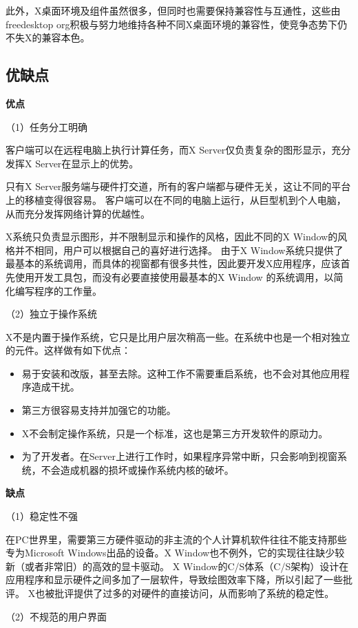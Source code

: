 \documentclass[doctor,openright,twoside]{sjtuthesis}
\providecommand{\tightlist}{%
    \setlength{\itemsep}{0pt}\setlength{\parskip}{0pt}}
\theoremstyle{plain}
\theoremstyle{definition}
\theoremstyle{remark}
\theoremstyle{ocrenumbox}
\theoremstyle{plain}
\begin{document}
此外，X桌面环境及组件虽然很多，但同时也需要保持兼容性与互通性，这些由freedesktop
org积极与努力地维持各种不同X桌面环境的兼容性，使竞争态势下仍不失X的兼容本色。

\subsection{优缺点}

\textbf{优点}

（1）任务分工明确

客户端可以在远程电脑上执行计算任务，而X
Server仅负责复杂的图形显示，充分发挥X Server在显示上的优势。

只有X
Server服务端与硬件打交道，所有的客户端都与硬件无关，这让不同的平台上的移植变得很容易。
客户端可以在不同的电脑上运行，从巨型机到个人电脑，从而充分发挥网络计算的优越性。

X系统只负责显示图形，并不限制显示和操作的风格，因此不同的X
Window的风格并不相同，用户可以根据自己的喜好进行选择。 由于X
Window系统只提供了最基本的系统调用，而具体的视窗都有很多共性，因此要开发X应用程序，应该首先使用开发工具包，而没有必要直接使用最基本的X
Window 的系统调用，以简化编写程序的工作量。

（2）独立于操作系统

X不是内置于操作系统，它只是比用户层次稍高一些。在系统中也是一个相对独立的元件。这样做有如下优点：

\begin{itemize}
\tightlist
\item
  易于安装和改版，甚至去除。这种工作不需要重启系统，也不会对其他应用程序造成干扰。
\item
  第三方很容易支持并加强它的功能。
\item
  X不会制定操作系统，只是一个标准，这也是第三方开发软件的原动力。
\item
  为了开发者。在Server上进行工作时，如果程序异常中断，只会影响到视窗系统，不会造成机器的损坏或操作系统内核的破坏。
\end{itemize}

\textbf{缺点}

（1）稳定性不强

在PC世界里，需要第三方硬件驱动的非主流的个人计算机软件往往不能支持那些专为Microsoft
Windows出品的设备。X
Window也不例外，它的实现往往缺少较新（或者非常旧）的高效的显卡驱动。 X
Window的C/S体系（C/S架构）设计在应用程序和显示硬件之间多加了一层软件，导致绘图效率下降，所以引起了一些批评。
X也被批评提供了过多的对硬件的直接访问，从而影响了系统的稳定性。

（2）不规范的用户界面
\end{document}
